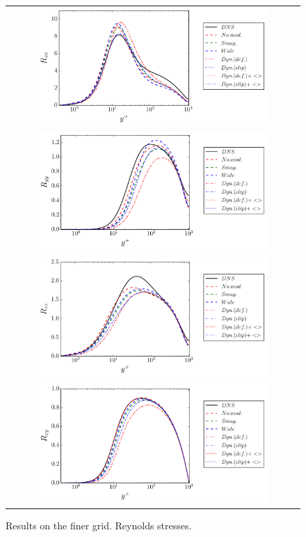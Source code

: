 \documentclass[a4paper]{article}
\begin{document}
\begin{figure}[htbp]
\begin{tabular}{c}
\includegraphics[width=0.8\textwidth]{./finer/rxx.pdf} \\
\includegraphics[width=0.8\textwidth]{./finer/ryy.pdf} \\
\includegraphics[width=0.8\textwidth]{./finer/rzz.pdf} \\
\includegraphics[width=0.8\textwidth]{./finer/rxy.pdf}
\end{tabular}
\caption{Results on the finer grid. Reynolds stresses.}
\label{fig-finer-rij}
\end{figure}
\end{document}
